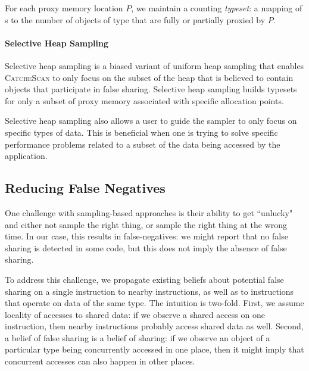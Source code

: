 \documentclass{sig-alternate}
\newcommand{\TextToolname}{CatcheScan}
\newcommand{\Toolname}{\textsc{\TextToolname{}}}
\begin{document}
For each proxy memory location $P$, we maintain a counting \emph{typeset}: a mapping of \TypeId{}s to the number of objects of type
\TypeId{} that are fully or partially proxied by $P$.

\paragraph{Selective Heap Sampling}
Selective heap sampling is a biased variant of uniform heap sampling that enables \Toolname{} to only focus on the subset
of the heap that is believed to contain objects that participate in false sharing. Selective heap sampling builds typesets
for only a subset of proxy memory associated with specific allocation points.

Selective heap sampling also allows a user to guide the sampler to only focus on specific types of data. This is beneficial
when one is trying to solve specific performance problems related to a subset of the data being accessed by the application.

\subsection{Reducing False Negatives}\label{sec:falsenegs}

One challenge with sampling-based approaches is their ability to get ``unlucky" and either not sample
the right thing, or sample the right thing at the wrong time. In our case, this results in false-negatives:
we might report that no false sharing is detected in some code, but this does not imply the absence of
false sharing.

To address this challenge, we propagate existing beliefs about potential false sharing on a single instruction
to nearby instructions, as well as to instructions that operate on data of the same type. The intuition is
two-fold. First, we assume locality of accesses to shared data: if we observe a shared access on one instruction,
then nearby instructions probably access shared data as well. Second, a belief of false sharing is a belief of
sharing: if we observe an object of a particular type being concurrently accessed in one place, then it might
imply that concurrent accesses can also happen in other places.
\end{document}
